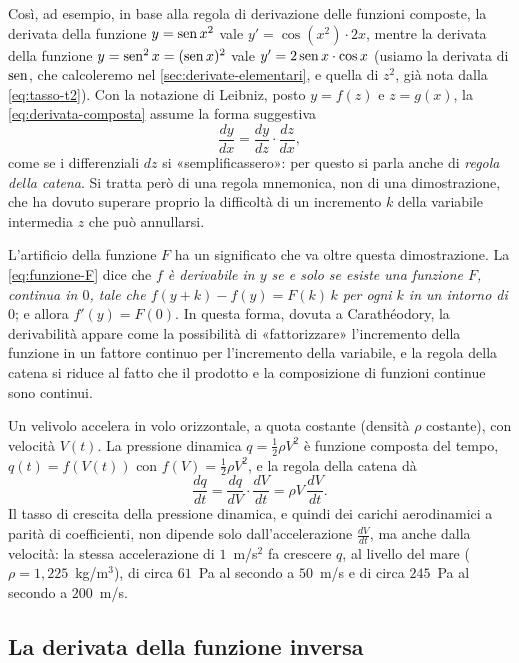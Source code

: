 Così, ad esempio, in base alla regola di derivazione delle funzioni composte, la derivata
della funzione $y=\operatorname{sen} x^{2}$ vale $y'=\cos(x^{2})\cdot2x$, mentre la derivata della
funzione $y=\operatorname{sen}^{2}x=(\operatorname{sen} x)^{2}$ vale $y'=2\operatorname{sen} x\cdot\cos x$ (usiamo la derivata di
$\operatorname{sen}$, che calcoleremo nel \cref{sec:derivate-elementari}, e quella di $z^{2}$, già nota
dalla \eqref{eq:tasso-t2}). Con la notazione di Leibniz, posto $y=f(z)$ e $z=g(x)$, la
\eqref{eq:derivata-composta} assume la forma suggestiva
\[
  \frac{dy}{dx}=\frac{dy}{dz}\cdot\frac{dz}{dx},
\]
come se i differenziali $dz$ si «semplificassero»: per questo si parla anche di
\emph{regola della catena}. Si tratta però di una regola mnemonica, non di una
dimostrazione, che ha dovuto superare proprio la difficoltà di un incremento $k$ della
variabile intermedia $z$ che può annullarsi.

\begin{osservazione}\label{oss:caratheodory}
L'artificio della funzione $F$ ha un significato che va oltre questa dimostrazione. La
\eqref{eq:funzione-F} dice che \emph{$f$ è derivabile in $y$ se e solo se esiste una
funzione $F$, continua in $0$, tale che $f(y+k)-f(y)=F(k)\,k$ per ogni $k$ in un intorno
di $0$}; e allora
$f'(y)=F(0)$. In questa forma, dovuta a Carathéodory, la derivabilità appare come la
possibilità di «fattorizzare» l'incremento della funzione in un fattore continuo per
l'incremento della variabile, e la regola della catena si riduce al fatto che il prodotto
e la composizione di funzioni continue sono continui.
\end{osservazione}

\begin{idea}
Un velivolo accelera in volo orizzontale, a quota costante (densità $\rho$ costante),
con velocità $V(t)$. La pressione dinamica $q=\frac12\rho V^{2}$ è funzione composta del
tempo, $q(t)=f(V(t))$ con $f(V)=\frac12\rho V^{2}$, e la regola della catena dà
\[
  \frac{dq}{dt}=\frac{dq}{dV}\cdot\frac{dV}{dt}=\rho V\,\frac{dV}{dt}.
\]
Il tasso di crescita della pressione dinamica, e quindi dei carichi aerodinamici a
parità di coefficienti, non dipende solo dall'accelerazione $\frac{dV}{dt}$, ma anche
dalla velocità: la stessa accelerazione di $1$~m/s$^{2}$ fa crescere $q$, al livello del
mare ($\rho=1{,}225$~kg/m$^{3}$), di circa $61$~Pa al secondo a $50$~m/s e di circa
$245$~Pa al secondo a $200$~m/s.
\end{idea}

\subsection{La derivata della funzione inversa}

